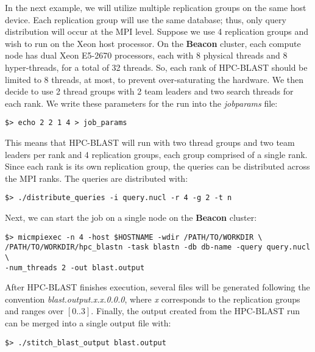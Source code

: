 \documentclass[10pt]{article}
\newcommand{\beac}{\textbf{Beacon }}
\begin{document}
In the next example, we will utilize multiple replication groups on the same host device.  Each replication group will use the same database; thus, only query distribution will occur at the MPI level.  Suppose we use 4 replication groups and wish to
run on the Xeon host processor.  On the \beac cluster, each compute node has dual Xeon E5-2670 processors, each with 8 physical threads and 8 hyper-threads, for a total of 32 threads.  So, each rank of HPC-BLAST should be limited to 8 threads,
at most, to prevent over-saturating the hardware.  We then decide to use 2 thread groups with 2 team leaders and two search threads for each rank.  We write these parameters for the run into the \emph{job\textunderscore params} file:
\begin{verbatim}
$> echo 2 2 1 4 > job_params
\end{verbatim}
\noindent This means that HPC-BLAST will run with two thread groups and two team leaders per rank and 4 replication groups, each group comprised of a single rank.  Since each rank is its own replication group, the queries can be distributed across the MPI
ranks.  The queries are distributed with:
\begin{verbatim}
$> ./distribute_queries -i query.nucl -r 4 -g 2 -t n
\end{verbatim}
\noindent Next, we can start the job on a single node on the \beac cluster:
\begin{verbatim}
$> micmpiexec -n 4 -host $HOSTNAME -wdir /PATH/TO/WORKDIR \
/PATH/TO/WORKDIR/hpc_blastn -task blastn -db db-name -query query.nucl \
-num_threads 2 -out blast.output
\end{verbatim}
\noindent After HPC-BLAST finishes execution, several files will be generated following the convention \emph{blast.output.x.x.0.0.0}, where  \emph{x} corresponds to the replication groups and ranges over \([0..3]\). 
Finally, the output created from the HPC-BLAST run can be merged into a single output file with:
\begin{verbatim}
$> ./stitch_blast_output blast.output
\end{verbatim}
\end{document}
